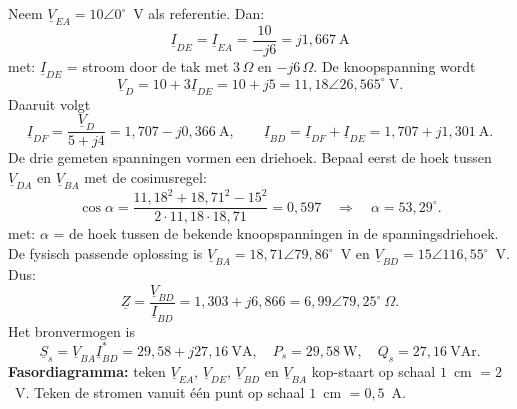 \documentclass[a4paper,11pt]{article}
\begin{document}
\begin{oefenblok}
    Neem $\underline{V}_{EA}=10\angle0^\circ$~V als referentie. Dan:
    \[
        \underline{I}_{DE}=\underline{I}_{EA}=\frac{10}{-j6}=j1{,}667\ \text{A}
    \]
    met: $\underline{I}_{DE}$ = stroom door de tak met $3\,\Omega$ en $-j6\,\Omega$.
    De knoopspanning wordt
    \[
        \underline{V}_D=10+3\underline{I}_{DE}=10+j5=11{,}18\angle26{,}565^\circ\ \text{V}.
    \]
    Daaruit volgt
    \[
        \underline{I}_{DF}=\frac{\underline{V}_D}{5+j4}=1{,}707-j0{,}366\ \text{A},\qquad
        \underline{I}_{BD}=\underline{I}_{DF}+\underline{I}_{DE}=1{,}707+j1{,}301\ \text{A}.
    \]
    De drie gemeten spanningen vormen een driehoek. Bepaal eerst de hoek tussen
    $\underline{V}_{DA}$ en $\underline{V}_{BA}$ met de cosinusregel:
    \[
        \cos\alpha=\frac{11{,}18^2+18{,}71^2-15^2}{2\cdot11{,}18\cdot18{,}71}
            =0{,}597\quad\Longrightarrow\quad\alpha=53{,}29^\circ.
    \]
    met: $\alpha$ = de hoek tussen de bekende knoopspanningen in de spanningsdriehoek.
    De fysisch passende oplossing is
    $\underline{V}_{BA}=18{,}71\angle79{,}86^\circ$~V en
    $\underline{V}_{BD}=15\angle116{,}55^\circ$~V. Dus:
    \[
        \underline{Z}=\frac{\underline{V}_{BD}}{\underline{I}_{BD}}
        =1{,}303+j6{,}866
        =\boxed{6{,}99\angle79{,}25^\circ\ \Omega}.
    \]
    Het bronvermogen is
    \[
        \underline{S}_s=\underline{V}_{BA}\underline{I}_{BD}^{*}
        =\boxed{29{,}58+j27{,}16\ \text{VA}},
        \quad P_s=29{,}58\ \text{W},\quad Q_s=27{,}16\ \text{VAr}.
    \]
    \textbf{Fasordiagramma:} teken $\underline{V}_{EA}$, $\underline{V}_{DE}$,
    $\underline{V}_{BD}$ en $\underline{V}_{BA}$ kop-staart op schaal $1$~cm $=2$~V.
    Teken de stromen vanuit één punt op schaal $1$~cm $=0{,}5$~A.
    \begin{figure}[H]\centering
\end{figure}
\end{oefenblok}
\end{document}
